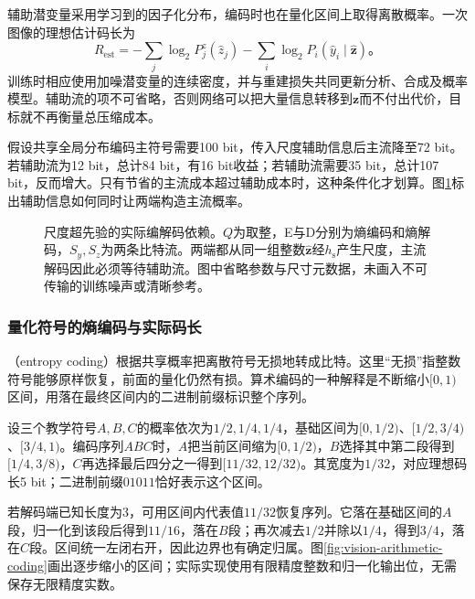 辅助潜变量采用学习到的因子化分布，编码时也在量化区间上取得离散概率。一次图像的理想估计码长为
\begin{equation}
 R_{\mathrm{est}}=
 -\sum_j\log_2 P_j^{z}(\hat z_j)
 -\sum_i\log_2 P_i(\hat y_i\mid\hat{\bm{z}})\text{。}
 \label{eq:vision-hyperprior-rate}
\end{equation}
训练时相应使用加噪潜变量的连续密度，并与重建损失共同更新分析、合成及概率模型。辅助流的项不可省略，否则网络可以把大量信息转移到$\bm{z}$而不付出代价，目标就不再衡量总压缩成本。

假设共享全局分布编码主符号需要100 bit，传入尺度辅助信息后主流降至72 bit。若辅助流为12 bit，总计84 bit，有16 bit收益；若辅助流需要35 bit，总计107 bit，反而增大。只有节省的主流成本超过辅助成本时，这种条件化才划算。图\ref{fig:vision-hyperprior-codec}标出辅助信息如何同时让两端构造主流概率。

\begin{figure}[htbp]
 \centering
 
 \caption{尺度超先验的实际编解码依赖。$Q$为取整，E与D分别为熵编码和熵解码，$S_y,S_z$为两条比特流。两端都从同一组整数$\hat{\bm{z}}$经$h_{\mathrm{s}}$产生尺度，主流解码因此必须等待辅助流。图中省略参数与尺寸元数据，未画入不可传输的训练噪声或清晰参考。}
 \label{fig:vision-hyperprior-codec}
\end{figure}
\FloatBarrier

\subsubsection{量化符号的熵编码与实际码长}
\label{sec:vision-restoration-entropy-coding}

（entropy coding）根据共享概率把离散符号无损地转成比特。这里“无损”指整数符号能够原样恢复，前面的量化仍然有损。算术编码的一种解释是不断缩小$[0,1)$区间，用落在最终区间内的二进制前缀标识整个序列。

设三个教学符号$A,B,C$的概率依次为$1/2,1/4,1/4$，基础区间为$[0,1/2)$、$[1/2,3/4)$、$[3/4,1)$。编码序列$ABC$时，$A$把当前区间缩为$[0,1/2)$，$B$选择其中第二段得到$[1/4,3/8)$，$C$再选择最后四分之一得到$[11/32,12/32)$。其宽度为$1/32$，对应理想码长5 bit；二进制前缀$01011$恰好表示这个区间。

若解码端已知长度为3，可用区间内代表值$11/32$恢复序列。它落在基础区间的$A$段，归一化到该段后得到$11/16$，落在$B$段；再次减去$1/2$并除以$1/4$，得到$3/4$，落在$C$段。区间统一左闭右开，因此边界也有确定归属。图\ref{fig:vision-arithmetic-coding}画出逐步缩小的区间；实际实现使用有限精度整数和归一化输出位，无需保存无限精度实数。

